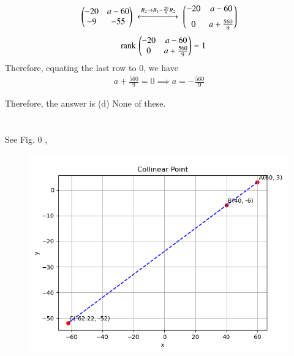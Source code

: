 \documentclass[journal]{IEEEtran}
\begin{document}
\begin{align}
\begin{pmatrix}-20 & a-60 \\ -9 & -55\end{pmatrix}
\;\xleftrightarrow{\,R_2 \to R_1 - \frac{20}{9}R_2\,}\;
\begin{pmatrix}-20 & a-60 \\[6pt] 0 & a + \frac{560}{9}\end{pmatrix}
\end{align}
\begin{align}
    \quad \text{rank}\,\begin{pmatrix}-20 & a-60 \\ 0 & a + \frac{560}{9}\end{pmatrix} = 1
\end{align}
Therefore, equating the last row to 0, we have
\begin{align}
    a + \frac{560}{9} = 0
    \implies a = -\frac{560}{9}
\end{align}

Therefore, the answer is (d) None of these.\\\\\\

See Fig. 0 ,
\begin{figure}[H]
\begin{center}
\includegraphics[width=0.6\columnwidth]{figs/fig.png}
\end{center}
\caption{}
\label{fig:Fig1}
\end{figure}
\end{document}
